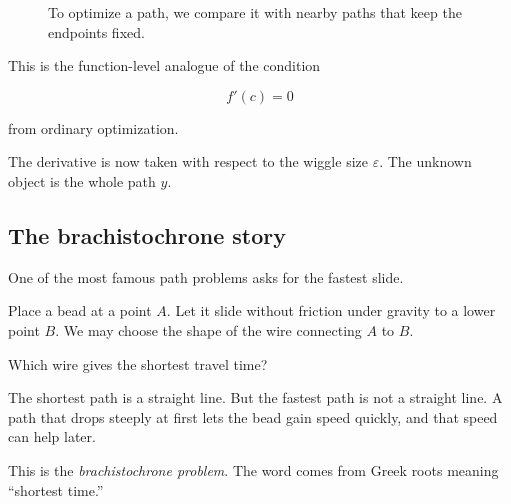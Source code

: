 \begin{figure}[h]
\centering
{}
\caption{To optimize a path, we compare it with nearby paths that keep the endpoints fixed.}
\label{fig:path-variation}
\end{figure}

This is the function-level analogue of the condition

\[
f'(c)=0
\]

from ordinary optimization.

The derivative is now taken with respect to the wiggle size \(\varepsilon\).  The unknown
object is the whole path \(y\).

\subsection{The brachistochrone story}
\label{subsec:brachistochrone-story}

One of the most famous path problems asks for the fastest slide.

Place a bead at a point \(A\).  Let it slide without friction under gravity to a lower
point \(B\).  We may choose the shape of the wire connecting \(A\) to \(B\).

Which wire gives the shortest travel time?

The shortest path is a straight line.  But the fastest path is not a straight line.  A path
that drops steeply at first lets the bead gain speed quickly, and that speed can help
later.

This is the \emph{brachistochrone problem}.  The word comes from Greek roots meaning
``shortest time.''

